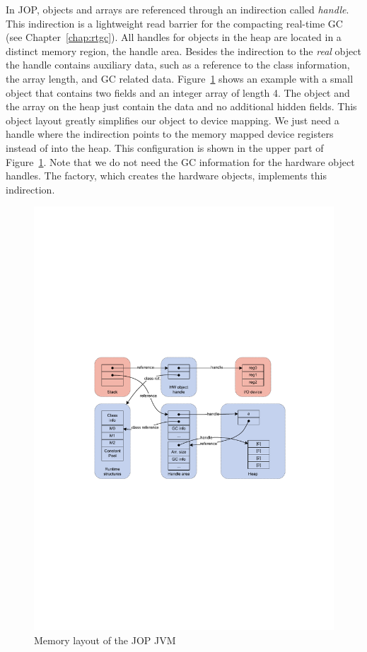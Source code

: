 In JOP, objects and arrays are referenced through an indirection
called \emph{handle}. This indirection is a lightweight read barrier
for the compacting real-time GC (see Chapter~\ref{chap:rtgc}). All
handles for objects in the heap are located in a distinct memory
region, the handle area. Besides the indirection to the \emph{real}
object the handle contains auxiliary data, such as a reference to the
class information, the array length, and GC related data.
Figure~\ref{fig:hwo:mem} shows an example with a small object that
contains two fields and an integer array of length 4. The object and
the array on the heap just contain the data and no additional hidden
fields. This object layout greatly simplifies our object to device
mapping. We just need a handle where the indirection points to the
memory mapped device registers instead of into the heap. This
configuration is shown in the upper part of Figure~\ref{fig:hwo:mem}.
Note that we do not need the GC information for the hardware object
handles. The factory, which creates the hardware objects, implements
this indirection.

\begin{figure}[t]
    \centering
    \includegraphics[scale=\picscale]{io/memory}
    \caption{Memory layout of the JOP JVM}\label{fig:hwo:mem}
\end{figure}


